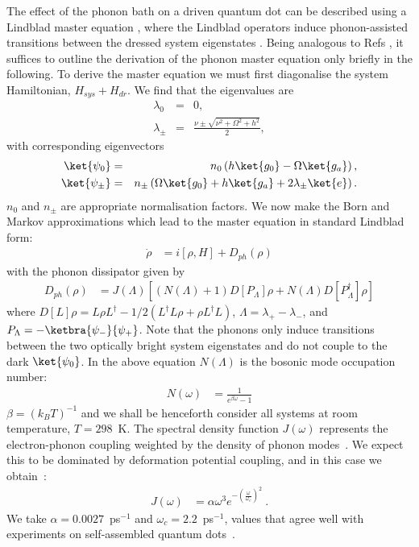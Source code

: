 The effect of the phonon bath on a driven quantum dot can be described using a Lindblad master equation \cite{gauger:2008}, where the Lindblad operators  induce phonon-assisted transitions between the dressed system eigenstates \cite{gauger:2010}. Being analogous to Refs \cite{gauger:2008, gauger:2010}, it suffices to outline the derivation of the  phonon master equation only briefly in the following. To derive the master equation we must first diagonalise the system Hamiltonian, $H_{sys} + H_{dr}$. We find that the eigenvalues are
\begin{eqnarray}
 \lambda_0 &=& 0 \nonumber, \\
 \lambda_\pm &=& \frac{\nu \pm \sqrt{\nu^2 + \Omega^2 + h^2}}{2},
\end{eqnarray}
with corresponding eigenvectors
\begin{eqnarray}
  \ket{\psi_0} &=& n_0 \left(h\ket{g_0} - \Omega\ket{g_a}\right), \nonumber \\
  \ket{\psi_\pm} &=& n_\pm \left( \Omega\ket{g_0} + h\ket{g_a} +2\lambda_\pm \ket{e} \right).
\end{eqnarray}
$n_0$ and $n_\pm$ are appropriate normalisation factors. We now make the Born and Markov approximations which lead to the master equation \cite{breuer02} in standard Lindblad form:
\begin{eqnarray}
  \dot{\rho} &= i\left[ \rho, H \right] + D_{ph}(\rho)
\end{eqnarray}
with the phonon dissipator given by
\begin{eqnarray}
  D_{ph}(\rho)  &= J(\Lambda) \left[ \left( N(\Lambda)+1 \right)D\left[ P_\Lambda \right] \rho + N(\Lambda)D[P_\Lambda^\dagger] \rho \right] 
  \label{eqn:phonondiss}
\end{eqnarray}
where $D[L]\rho = L\rho L^\dagger - 1/2(L^\dagger L\rho + \rho L^\dagger L)$, $\Lambda = \lambda_+ - \lambda_- $, and $P_\Lambda = -\ketbra{\psi_-}{\psi_+}$. Note that the phonons only induce transitions between the two optically bright system eigenstates and do not couple to the dark $\ket{\psi_0}$. In the above equation $N(\Lambda)$ is the bosonic mode occupation number:
\begin{eqnarray}
  N(\omega) &= \frac{1}{e^{\beta \omega}-1}
\end{eqnarray}
$\beta = (k_BT)^{-1}$ and we shall be henceforth consider all systems at room temperature, $T = 298$~K. The spectral density function $J(\omega)$ represents the electron-phonon coupling weighted by the density of phonon modes~\cite{breuer02}. We expect this to be dominated by deformation potential coupling, and in this case we obtain~\cite{gauger:2008}:
\begin{eqnarray}
  J(\omega) &= \alpha \omega^3 e^{-\left(\frac{\omega}{\omega_c}\right)^2}~.
  \label{eq:specdens}
\end{eqnarray}
We take $\alpha = 0.0027$~ps$^{-1}$ and $\omega_c = 2.2$~ps$^{-1}$, values that agree well with experiments on self-assembled quantum dots~\cite{ramsay:2010, ramsay2:2010}.

